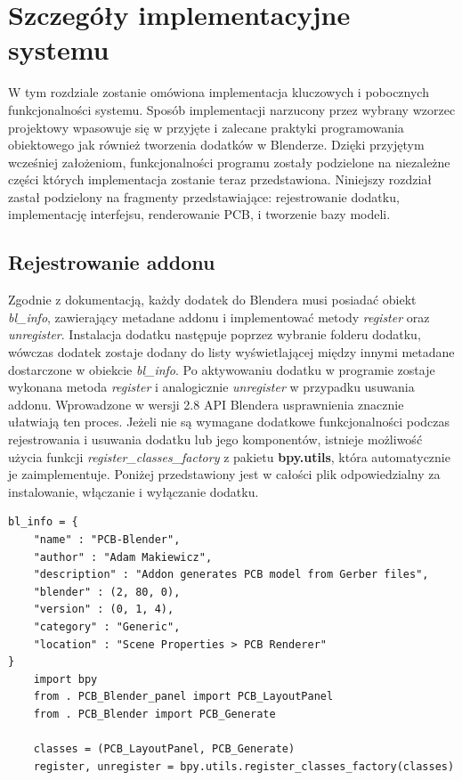 \documentclass{xmgr}
\begin{document}
\chapter{Szczegóły implementacyjne systemu}
W tym rozdziale zostanie omówiona implementacja kluczowych i pobocznych funkcjonalności systemu. Sposób implementacji narzucony przez wybrany wzorzec projektowy wpasowuje się w przyjęte i zalecane praktyki programowania obiektowego jak również tworzenia dodatków w Blenderze. Dzięki przyjętym wcześniej założeniom, funkcjonalności programu zostały podzielone na niezależne części których implementacja zostanie teraz przedstawiona. Niniejszy rozdział zastał podzielony na fragmenty przedstawiające: rejestrowanie dodatku, implementację interfejsu, renderowanie PCB, i tworzenie bazy modeli.


\section {Rejestrowanie addonu}
Zgodnie z dokumentacją, każdy dodatek do Blendera musi posiadać obiekt \emph{bl\_info}, zawierający metadane addonu i implementować metody \emph{register} oraz \emph{unregister}. Instalacja dodatku następuje poprzez wybranie folderu dodatku, wówczas dodatek zostaje dodany do listy wyświetlającej między innymi metadane dostarczone w obiekcie \emph{bl\_info}. Po aktywowaniu dodatku w programie zostaje wykonana metoda \emph{register} i analogicznie \emph{unregister} w przypadku usuwania addonu. Wprowadzone w wersji 2.8 API Blendera usprawnienia znacznie ułatwiają ten proces. Jeżeli nie są wymagane dodatkowe funkcjonalności podczas rejestrowania i usuwania dodatku lub jego komponentów, istnieje możliwość użycia funkcji \emph{register\_classes\_factory} z pakietu \textbf{bpy.utils}, która automatycznie je zaimplementuje. Poniżej przedstawiony jest w całości plik odpowiedzialny za instalowanie, włączanie i wyłączanie dodatku.
\newpage
{}
\begin{lstlisting}
bl_info = {
	"name" : "PCB-Blender",
	"author" : "Adam Makiewicz",
	"description" : "Addon generates PCB model from Gerber files",
	"blender" : (2, 80, 0),
	"version" : (0, 1, 4),
	"category" : "Generic",
	"location" : "Scene Properties > PCB Renderer"
}
	import bpy
	from . PCB_Blender_panel import PCB_LayoutPanel
	from . PCB_Blender import PCB_Generate

	classes = (PCB_LayoutPanel, PCB_Generate)
	register, unregister = bpy.utils.register_classes_factory(classes)
\end{lstlisting}
\end{document}
